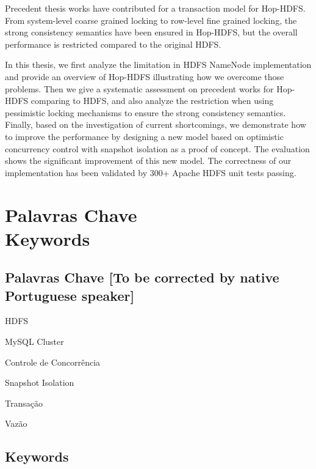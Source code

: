 \noindent Precedent thesis works have contributed for a transaction model for Hop-HDFS. From system-level coarse grained locking to row-level fine grained locking, the strong consistency semantics have been ensured in Hop-HDFS, but the overall performance is restricted compared to the original HDFS.

\noindent In this thesis, we first analyze the limitation in HDFS NameNode implementation and provide an overview of Hop-HDFS illustrating how we overcome those problems. Then we give a systematic assessment on precedent works for Hop-HDFS comparing to HDFS, and also analyze the restriction when using pessimistic locking mechanisms to ensure the strong consistency semantics. Finally, based on the investigation of current shortcomings, we demonstrate how to improve the performance by designing a new model based on optimistic concurrency control with snapshot isolation as a proof of concept. The evaluation shows the significant improvement of this new model. The correctness of our implementation has been validated by 300+ Apache HDFS unit tests passing.

\newpage


\chapter*{Palavras Chave \\ Keywords}
\thispagestyle{empty}

\section*{Palavras Chave [To be corrected by native Portuguese speaker]}
{\large %

\noindent HDFS

\noindent MySQL Cluster

\noindent Controle de Concorrência

\noindent Snapshot Isolation

\noindent Transação

\noindent Vazão

}

\section*{Keywords}

